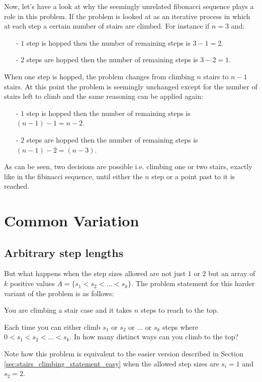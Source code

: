 

Now, let's have a look at why the seemingly unrelated fibonacci sequence plays a role in this problem. If the problem is looked at as an iterative process in which at each step a certain number of stairs are climbed. For instance if $n = 3$ and:
\begin{itemize}
	\item[-] $1$ step is hopped then the number of remaining steps is $3-1 = 2$. 
	\item[-] $2$ steps are hopped then the number of remaining steps is $3-2 = 1$.
\end{itemize}
When one step is hopped, the problem changes from climbing $n$ stairs to $n-1$ stairs. At this point the problem is seemingly unchanged except for the number of stairs left to climb and the same reasoning can be applied again:
\begin{itemize}
	\item[-] $1$ step is hopped then the number of remaining steps is $(n-1)-1 = n-2$. 
	\item[-] $2$ steps are hopped then the number of remaining steps is $(n-1)-2 = (n-3)$.
\end{itemize}
As can be seen, two decisions are possible i.e. climbing one or two stairs, exactly like in the fibinacci sequence, until either the $n$ step or a point past to it is reached.

\section{Common Variation
}
\subsection{Arbitrary step lengths}
\label{stairs_climbing:sec:arbitrary_steps}
But what happens when the step sizes allowed are not just $1$ or $2$ but an array of $k$ positive values $A=\{s_1 < s_2 < \ldots < s_k\}$. The problem statement for this harder variant of the problem is as follows:

\begin{exercise}
You are climbing a stair case and it takes $n$ steps to reach to the top.

Each time you can either climb $s_1$ or $s_2$ or $\ldots$ or $s_k$ steps where $0 < s_1 < s_2 < \ldots < s_k$. In how many distinct ways can you climb to the top?
\end{exercise}

Note how this problem is equivalent to the easier version described in Section \ref{sec:stairs_climbing_statement_easy} when the allowed step sizes are $s_i = 1$ and $s_2=2$.


